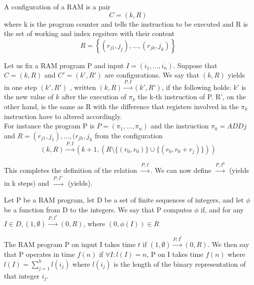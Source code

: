 \begin{definition}
    A configuration of a RAM is a pair
    \[ 
        C=(k,R) 
    \]
    where k is the program counter and tells the instruction to be executed and R is the set of working and index regsiters with their content
    \[ 
        R = \left\{ (r_{j1}, j_{j}), \ldots,(r_{jk}, j_{k}) \right\} 
    \]
\end{definition}
\begin{definition}
    Let us fix a RAM program P and input $I = (i_{1}, \ldots,i_{n})$. Suppose that $C=(k,R)$ and $C'=(k', R')$ are configurations. We say that $(k,R)$ yields in one step $(k',R')$ , written $(k, R) \overset{P,I}{\longrightarrow} ( k', R')$, if the following holds: $k'$ is the new value of $k$ after the execution of $\pi_k$ the k-th instruction of P. R', on the other hand, is the same as R with the difference that registers involved in the $\pi_k$ instruction have to altered accordingly.\\
    For instance the program P is $P=(\pi_{1}, \ldots,\pi_{n})$ and the instruction $\pi_k = ADD j$ and $R={(r_{j1}, j_{1}), \ldots,(r_{jh }, j_{h}}$ from the configuration \[ 
    (k, R) \overset{P,I}{\longrightarrow} ( k+1,(R\setminus\{(r_0,r_0)\}\cup \{(r_0, r_0+r_j)\}) )
\]
\end{definition}
This completes the definition of the relation $\overset{P,I}{\longrightarrow}$. We can now define $\overset{P,I^k}{\longrightarrow}$ (yields in k steps) and $\overset{P,I^+}{\longrightarrow}$ (yields).
\begin{definition}
    Let P be a RAM program, let D be a set of finite sequences of integers, and let $\phi$ be a function from D to the integers. We say that P computes $\phi$ if, and for any $I \in D, (1,\emptyset) \overset{P,I^*}{\longrightarrow} (0,R)$, where $(0, \phi(I)) \in R$
\end{definition}

The RAM program P on input I takes time $t$ if $(1, \emptyset) \overset{P,I^t}{\longrightarrow} (0,R)$. We then say that
P operates in time $f(n)$ if $\forall I: l(I) = n $, P on I takes time $f(n)$ where $l(I) = \sum_{j=1}^{h}{l(i_j)}$ where $l(i_j)$ is the length of the binary representation of that integer $i_j$.
